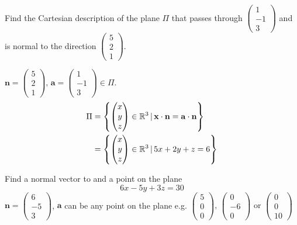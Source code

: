 \documentclass[10pt, a4paper]{article}
\newcommand{\mbf}[1]{\mathbf{#1}}
\begin{document}
\begin{example}
    Find the Cartesian description of the plane $\Pi$ that passes through $\begin{pmatrix}
        1 \\ -1 \\ 3
    \end{pmatrix}$ and is normal to the direction $\begin{pmatrix}
        5 \\ 2 \\ 1
    \end{pmatrix}$.

    $\mbf{n} = \begin{pmatrix}
        5 \\ 2 \\ 1
    \end{pmatrix},\, \mbf{a} = \begin{pmatrix}
        1 \\ -1 \\ 3
    \end{pmatrix} \in \Pi$.
    \begin{align*}
    \Pi &= \left\{ \begin{pmatrix}
        x \\ y \\ z
    \end{pmatrix} \in \R ^ 3\,|\, \mbf{x \cdot n = a \cdot n}\right\} \\
    &=\left\{\begin{pmatrix}
        x \\ y \\ z
    \end{pmatrix} \in \R ^ 3\,|\, 5x + 2y + z = 6\right\}
    \end{align*}
\end{example}

\begin{example}
    Find a normal vector to and a point on the plane
    \[
    6x - 5y + 3z = 30
    \]
    $\mbf{n} = \begin{pmatrix}
        6 \\ -5 \\ 3
    \end{pmatrix}$, $\mbf{a}$ can be any point on the plane e.g. $\begin{pmatrix}
        5 \\ 0 \\ 0
    \end{pmatrix},\,\begin{pmatrix}
        0 \\ -6 \\ 0
    \end{pmatrix} \text{ or } \begin{pmatrix}
        0 \\ 0 \\ 10
    \end{pmatrix}$
\end{example}
\end{document}
